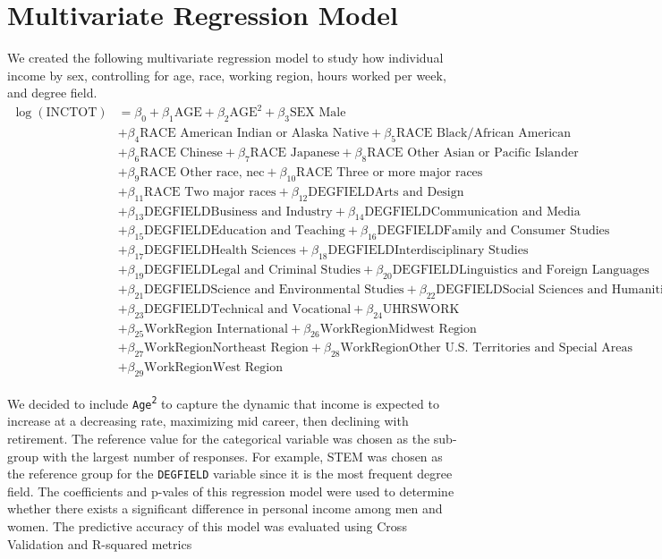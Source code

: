 \documentclass{article}
\begin{document}
\section*{Multivariate Regression Model}
We created the following multivariate regression model to study how individual income by sex, controlling for age, race, working region, hours worked per week, and degree field. 
\begin{equation*}
\begin{aligned}
\log(\text{INCTOT}) &= \beta_0 + \beta_1 \text{AGE} + \beta_2 \text{AGE}^2 + \beta_3 \text{SEX Male} \\
&+ \beta_4 \text{RACE American Indian or Alaska Native} + \beta_5 \text{RACE Black/African American} \\
&+ \beta_6 \text{RACE Chinese} + \beta_7 \text{RACE Japanese} + \beta_8 \text{RACE Other Asian or Pacific Islander} \\
&+ \beta_9 \text{RACE Other race, nec} + \beta_{10} \text{RACE Three or more major races} \\
&+ \beta_{11} \text{RACE Two major races} + \beta_{12} \text{DEGFIELDArts and Design} \\
&+ \beta_{13} \text{DEGFIELDBusiness and Industry} + \beta_{14} \text{DEGFIELDCommunication and Media} \\
&+ \beta_{15} \text{DEGFIELDEducation and Teaching} + \beta_{16} \text{DEGFIELDFamily and Consumer Studies} \\
&+ \beta_{17} \text{DEGFIELDHealth Sciences} + \beta_{18} \text{DEGFIELDInterdisciplinary Studies} \\
&+ \beta_{19} \text{DEGFIELDLegal and Criminal Studies} + \beta_{20} \text{DEGFIELDLinguistics and Foreign Languages} \\
&+ \beta_{21} \text{DEGFIELDScience and Environmental Studies} + \beta_{22} \text{DEGFIELDSocial Sciences and Humanities} \\
&+ \beta_{23} \text{DEGFIELDTechnical and Vocational} + \beta_{24} \text{UHRSWORK} \\
&+ \beta_{25} \text{WorkRegion International} + \beta_{26} \text{WorkRegionMidwest Region} \\
&+ \beta_{27} \text{WorkRegionNortheast Region} + \beta_{28} \text{WorkRegionOther U.S. Territories and Special Areas} \\
&+ \beta_{29} \text{WorkRegionWest Region}
\end{aligned}
\end{equation*}

We decided to include \texttt{Age\textsuperscript{2}} to capture the dynamic that income is expected to increase at a decreasing rate, maximizing mid career, then declining with retirement. The reference value for the categorical variable was chosen as the sub-group with the largest number of responses. For example, STEM was chosen as the reference group for the \texttt{DEGFIELD} variable since it is the most frequent degree field. The coefficients and p-vales of this regression model were used to determine whether there exists a significant difference in personal income among men and women. The predictive accuracy of this model was evaluated using Cross Validation and R-squared metrics
\end{document}

